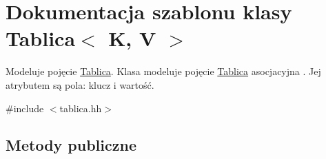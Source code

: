 \hypertarget{class_tablica}{\section{\-Dokumentacja szablonu klasy \-Tablica$<$ \-K, \-V $>$}
\label{class_tablica}
}


\-Modeluje pojęcie \hyperlink{class_tablica}{\-Tablica}. \-Klasa modeluje pojęcie \hyperlink{class_tablica}{\-Tablica} asocjacyjna . \-Jej atrybutem są pola\-: klucz i wartość.  




{\ttfamily \#include $<$tablica.\-hh$>$}

\subsection*{\-Metody publiczne}
